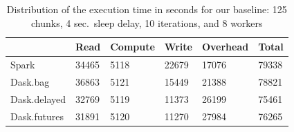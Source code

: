 \documentclass[conference]{IEEEtran}
\begin{document}
\begin{table}[!t]
    \renewcommand{\arraystretch}{1.3}
    \caption{Distribution of the execution time in seconds for our baseline: 125
    chunks, 4 sec.\ sleep delay, 10 iterations, and 8 workers}\label{tb:inc-base}
    \centering
    \begin{tabular}{llllll}
    \hline
                    & Read  & Compute & Write & Overhead & Total \\ \hline
    Spark        & 34465 & 5118    & 22679 & 17076    & 79338 \\
    Dask.bag     & 36863 & 5121    & 15449 & 21388    & 78821 \\
    Dask.delayed & 32769 & 5119    & 11373 & 26199    & 75461 \\
    Dask.futures & 31891 & 5120    & 11270 & 27984    & 76265 \\ \hline
    \end{tabular}
 \end{table}
\end{document}
